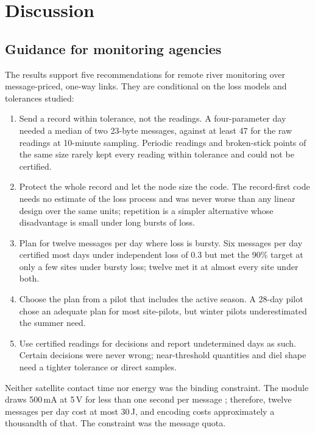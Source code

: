 \section{Discussion}
\label{sec:discussion}

\subsection{Guidance for monitoring agencies}
The results support five recommendations for remote river monitoring over message-priced, one-way links. They are conditional on the loss models and tolerances studied:
\begin{enumerate}
  \item Send a record within tolerance, not the readings. A four-parameter day needed a median of two 23-byte messages, against at least 47 for the raw readings at 10-minute sampling. Periodic readings and broken-stick points of the same size rarely kept every reading within tolerance and could not be certified.
  \item Protect the whole record and let the node size the code. The record-first code needs no estimate of the loss process and was never worse than any linear design over the same units; repetition is a simpler alternative whose disadvantage is small under long bursts of loss.
  \item Plan for twelve messages per day where loss is bursty. Six messages per day certified most days under independent loss of 0.3 but met the 90\% target at only a few sites under bursty loss; twelve met it at almost every site under both.
  \item Choose the plan from a pilot that includes the active season. A 28-day pilot chose an adequate plan for most site-pilots, but winter pilots underestimated the summer need.
  \item Use certified readings for decisions and report undetermined days as such. Certain decisions were never wrong; near-threshold quantities and diel shape need a tighter tolerance or direct samples.
\end{enumerate}

Neither satellite contact time nor energy was the binding constraint. The module draws 500\,mA at 5\,V for less than one second per message \citep{kineis2023kim1}; therefore, twelve messages per day cost at most 30\,J, and encoding costs approximately a thousandth of that. The constraint was the message quota.

